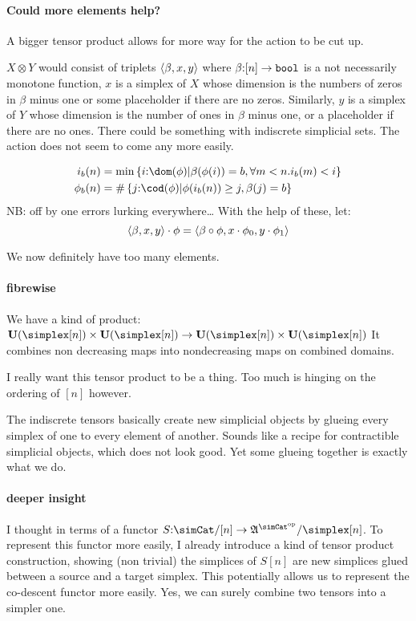 \documentclass[csh.tex]{subfiles}
\begin{document}
\paragraph{Could more elements help?}
A bigger tensor product allows for more way for the action to be cut up.


$X\otimes Y$ would consist of triplets $\left\langle \beta,x,y \right\rangle$ where $\beta\mathord : [n]\to\mathtt{bool} $ is a not necessarily monotone function, $x$ is a simplex of $X$ whose dimension is the numbers of zeros in $\beta$ minus one or some placeholder if there are no zeros. 
Similarly, $y$ is a simplex of $Y$ whose dimension is the number of ones in $\beta$ minus one, or a placeholder if there are no ones. 
There could be something with indiscrete simplicial sets.
The action does not seem to come any more easily.

\begin{align*}
i_b(n) &= \min\set{i\of\dom(\phi) | \beta(\phi(i)) = b, \forall m < n. i_b(m) < i}\\
\phi_b(n) &= \#\set{j\of\cod(\phi) | \phi(i_b(n))\geq j, \beta(j) = b}
\end{align*}
NB: off by one errors lurking everywhere\dots
With the help of these, let:
\[ \left\langle \beta,x,y \right\rangle\cdot\phi = \left\langle \beta\circ \phi,x\cdot\phi_0,y\cdot\phi_1 \right\rangle \]

We now definitely have too many elements. 

\paragraph{fibrewise}
We have a kind of product:
$\base(\simplex[n])\times\base(\simplex[n]) \to \base(\simplex[n])\times\base(\simplex[n])$
It combines non decreasing maps into nondecreasing maps on combined domains.

I really want this tensor product to be a thing. Too much is hinging on the ordering of $[n]$ however.

The indiscrete tensors basically create new simplicial objects by glueing every simplex of one to every element of another. Sounds like a recipe for contractible simplicial objects, which does not look good. Yet some glueing together is exactly what we do.

\paragraph{deeper insight}
I thought in terms of a functor $S\of \simCat/[n]\to \ambient\s/\simplex[n]$. To represent this functor more easily, I already introduce a kind of tensor product construction, showing (non trivial) the simplices of $S[n]$ are new simplices glued between a source and a target simplex. This potentially allows us to represent the co-descent functor more easily. Yes, we can surely combine two tensors into a simpler one.
\end{document}
